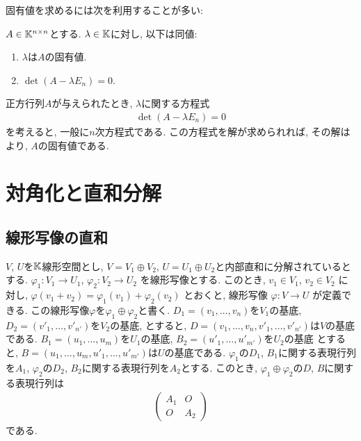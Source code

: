 固有値を求めるには次を利用することが多い:
\begin{prop}
\label{prop:mat:eignevalue:rootofcharpoly}
  $A\in\mathbb{K}^{n\times n}$とする.
  $\lambda \in \mathbb{K}$に対し, 以下は同値:
  \begin{enumerate}
  \item $\lambda$は$A$の固有値.
  \item $\det(A-\lambda E_n)=0$.
  \end{enumerate}
\end{prop}

正方行列$A$が与えられたとき,
$\lambda$に関する方程式
\begin{align*}
\det(A-\lambda E_n)=0
\end{align*}
を考えると,
一般に$n$次方程式である.
この方程式を解が求められれば,
その解は
より,
$A$の固有値である.


\begin{quiz}
\end{quiz}



\chapter{対角化と直和分解}
\section{線形写像の直和}
$V$, $U$を$\mathbb{K}$線形空間とし,
$V=V_1\oplus V_2$,
$U=U_1\oplus U_2$と内部直和に分解されているとする.
$\varphi_1\colon V_1\to U_1$,
$\varphi_2\colon V_2\to U_2$
を線形写像とする.
このとき,
$v_1\in V_1$, $v_2\in V_2$
に対し,
$\varphi(v_1+v_2)=\varphi_1(v_1)+\varphi_2(v_2)$
とおくと,
線形写像
$\varphi\colon V\to U$
が定義できる.
この線形写像$\varphi$を$\varphi_1\oplus \varphi_2$と書く.
$D_1=(v_1,\ldots,v_n)$を$V_1$の基底,
$D_2=(v'_1,\ldots,v'_{n'})$を$V_2$の基底,
とすると,
$D=(v_1,\ldots,v_n,v'_1,\ldots,v'_{n'})$は$V$の基底である.
$B_1=(u_1,\ldots,u_m)$を$U_1$の基底,
$B_2=(u'_1,\ldots,u'_{m'})$を$U_2$の基底
とすると,
$B=(u_1,\ldots,u_m,u'_1,\ldots,u'_{m'})$は$U$の基底である.
$\varphi_1$の$D_1$, $B_1$に関する表現行列を$A_1$,
$\varphi_2$の$D_2$, $B_2$に関する表現行列を$A_2$とする.
このとき,
$\varphi_1\oplus \varphi_2$の$D$, $B$に関する表現行列は
\begin{align*}
  \begin{pmatrix}A_1&O\\O&A_2\end{pmatrix}
\end{align*}
である.

